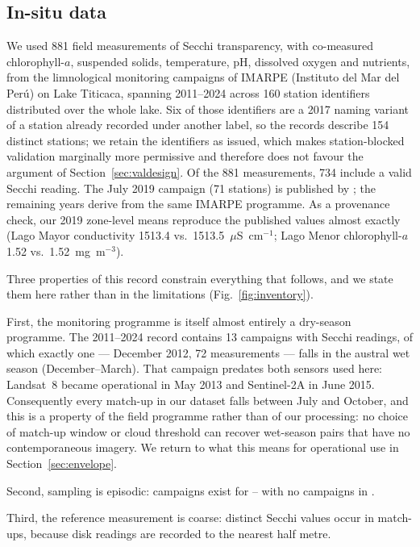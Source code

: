 \documentclass[preprint,review,12pt,authoryear]{elsarticle}
\begin{document}
\subsection{In-situ data}

We used 881 field measurements of Secchi transparency, with co-measured
chlorophyll-$a$, suspended solids, temperature, pH, dissolved oxygen and
nutrients, from the limnological monitoring campaigns of IMARPE (Instituto
del Mar del Per\'u) on Lake Titicaca, spanning 2011--2024 across 160 station
identifiers distributed over the whole lake. Six of those identifiers are a
2017 naming variant of a station already recorded under another label, so the
records describe 154 distinct stations; we retain the identifiers as issued,
which makes station-blocked validation marginally more permissive and
therefore does not favour the argument of Section~\ref{sec:valdesign}. Of the
881 measurements, 734 include a valid Secchi reading. The July 2019 campaign
(71 stations) is published by \citet{Siguayro2022data}; the remaining years derive from the same IMARPE
programme. As a provenance check, our 2019 zone-level means reproduce the
published values almost exactly (Lago Mayor conductivity 1513.4 vs.\
1513.5~$\mu$S~cm$^{-1}$; Lago Menor chlorophyll-$a$ 1.52 vs.\
1.52~mg~m$^{-3}$).

Three properties of this record constrain everything that follows, and we
state them here rather than in the limitations (Fig.~\ref{fig:inventory}).

First, the monitoring programme is itself almost entirely a dry-season
programme. The 2011--2024 record contains 13 campaigns with Secchi readings,
of which exactly one --- December 2012, 72 measurements --- falls in the
austral wet season (December--March). That campaign predates both sensors
used here: Landsat~8 became operational in May 2013 and Sentinel-2A in June
2015. Consequently every match-up in our dataset falls between July and
October, and this is a property of the field programme rather than of our
processing: no choice of match-up window or cloud threshold can recover
wet-season pairs that have no contemporaneous imagery. We return to what this
means for operational use in Section~\ref{sec:envelope}.

Second, sampling is episodic: campaigns exist for
\numYearFirst--\numYearLast{} with no campaigns in \numYearsMissing.

Third, the reference measurement is coarse: \numSecchiUniqueValues{} distinct
Secchi values occur in \numMatchupsSecchi{} match-ups, because disk readings
are recorded to the nearest half metre.
\end{document}
